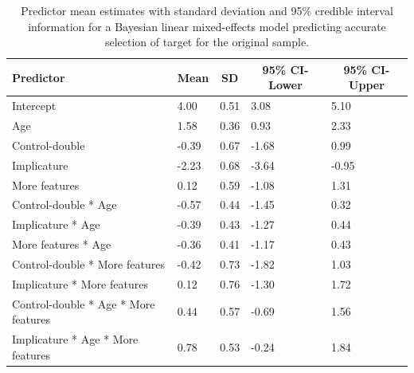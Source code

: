 \documentclass[man]{apa6}
\begin{document}
\begin{table}[tbp]
\begin{center}
\begin{threeparttable}
\caption{\label{tab:brmaccSample1}Predictor mean estimates with standard deviation and 95\% credible interval information for a Bayesian linear mixed-effects model predicting accurate selection of target for the original sample.}
\begin{tabular}{lllll}
\toprule
Predictor & \multicolumn{1}{c}{Mean} & \multicolumn{1}{c}{SD} & \multicolumn{1}{c}{95\% CI-Lower} & \multicolumn{1}{c}{95\% CI-Upper}\\
\midrule
Intercept & 4.00 & 0.51 & 3.08 & 5.10\\
Age & 1.58 & 0.36 & 0.93 & 2.33\\
Control-double & -0.39 & 0.67 & -1.68 & 0.99\\
Implicature & -2.23 & 0.68 & -3.64 & -0.95\\
More features & 0.12 & 0.59 & -1.08 & 1.31\\
Control-double * Age & -0.57 & 0.44 & -1.45 & 0.32\\
Implicature * Age & -0.39 & 0.43 & -1.27 & 0.44\\
More features * Age & -0.36 & 0.41 & -1.17 & 0.43\\
Control-double * More features & -0.42 & 0.73 & -1.82 & 1.03\\
Implicature * More features & 0.12 & 0.76 & -1.30 & 1.72\\
Control-double * Age * More features & 0.44 & 0.57 & -0.69 & 1.56\\
Implicature * Age * More features & 0.78 & 0.53 & -0.24 & 1.84\\
\bottomrule
\end{tabular}
\end{threeparttable}
\end{center}
\end{table}
\end{document}
